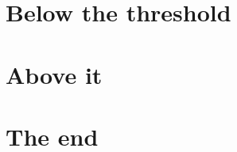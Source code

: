\documentclass{article}
\begin{document}
\section{Below the threshold}
\lipsum[1-6]
\section{Above it}
\lipsum[7-14]
\section{The end}
\lipsum[15-16]
\end{document}
